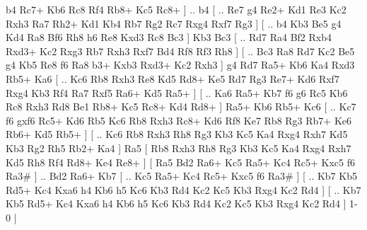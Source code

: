 b4  Rc7+ Kb6  Rc8 Rf4  Rb8+ Kc5  Rc8+   ] .. b4 [ .. Re7  g4 Re2+  Kd1 Re3  Kc2 Rxh3  Ra7 Rh2+  Kd1 Kb4  Rb7 Rg2  Rc7 Rxg4  Rxf7 Rg3   ]  [ .. b4  Kb3 Be5  g4 Kd4  Ra8 Bf6  Rh8 h6  Re8 Kxd3  Rc8 Bc3   ]  Kb3   Bc3 [ .. Rd7  Ra4 Bf2  Rxb4 Rxd3+  Kc2 Rxg3  Rb7 Rxh3  Rxf7 Bd4  Rf8 Rf3  Rh8   ]  [ .. Bc3  Ra8 Rd7  Kc2 Be5  g4 Kb5  Re8 f6  Ra8 b3+  Kxb3 Rxd3+  Kc2 Rxh3   ]  g4   Rd7    Ra5+   Kb6    Ka4   Rxd3    Rb5+   Ka6 [ .. Kc6  Rb8 Rxh3  Re8 Kd5  Rd8+ Ke5  Rd7 Rg3  Re7+ Kd6  Rxf7 Rxg4  Kb3 Rf4  Ra7 Rxf5  Ra6+ Kd5  Ra5+   ]  [ .. Ka6  Ra5+ Kb7  f6 g6  Rc5 Kb6  Rc8 Rxh3  Rd8 Be1  Rb8+ Kc5  Rc8+ Kd4  Rd8+   ]  Ra5+   Kb6    Rb5+   Kc6 [ .. Kc7  f6 gxf6  Rc5+ Kd6  Rb5 Kc6  Rb8 Rxh3  Rc8+ Kd6  Rf8 Ke7  Rb8 Rg3  Rb7+ Ke6  Rb6+ Kd5  Rb5+   ]  [ .. Kc6  Rb8 Rxh3  Rh8 Rg3  Kb3 Kc5  Ka4 Rxg4  Rxh7 Kd5  Kb3 Rg2  Rh5 Rb2+  Ka4   ]  Ra5 [  Rb8 Rxh3  Rh8 Rg3  Kb3 Kc5  Ka4 Rxg4  Rxh7 Kd5  Rh8 Rf4  Rd8+ Ke4  Re8+   ]  [  Ra5 Bd2  Ra6+ Kc5  Ra5+ Kc4  Rc5+ Kxc5  f6 Ra3#   ] .. Bd2    Ra6+   Kb7 [ .. Kc5  Ra5+ Kc4  Rc5+ Kxc5  f6 Ra3#   ]  [ .. Kb7  Kb5 Rd5+  Kc4 Kxa6  h4 Kb6  h5 Kc6  Kb3 Rd4  Kc2 Kc5  Kb3 Rxg4  Kc2 Rd4   ]  [ .. Kb7  Kb5 Rd5+  Kc4 Kxa6  h4 Kb6  h5 Kc6  Kb3 Rd4  Kc2 Kc5  Kb3 Rxg4  Kc2 Rd4   ] 1-0  |
